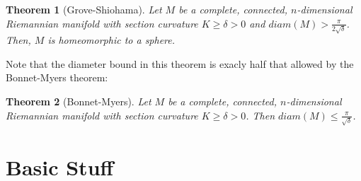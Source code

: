 \documentclass[12pt]{article}
\newtheorem{thm}{Theorem}[section]
\begin{document}
\begin{thm}[Grove-Shiohama] Let $M$ be a complete, connected, $n$-dimensional Riemannian manifold with section curvature $K \geq \delta > 0$ and $diam(M) > \frac{\pi}{2\sqrt{\delta}}$. Then, $M$ is homeomorphic to a sphere.
\end{thm}

\noindent Note that the diameter bound in this theorem is exacly half that allowed by the Bonnet-Myers theorem:

\begin{thm}[Bonnet-Myers] Let $M$ be a complete, connected, $n$-dimensional Riemannian manifold with section curvature $K \geq \delta > 0$. Then $diam(M) \leq \frac{\pi}{\sqrt{\delta}}$.
\end{thm}

\section{Basic Stuff}
\label{sect:basics}





\end{document}
